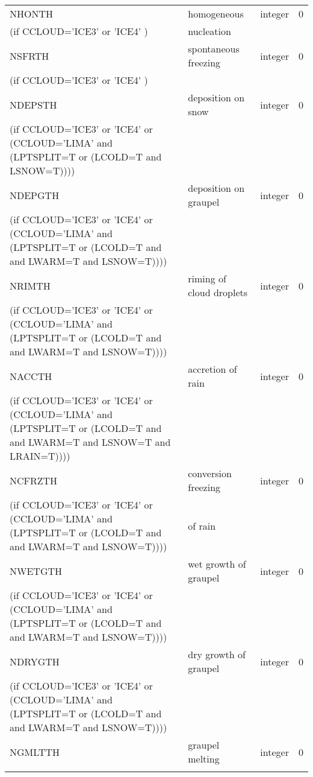 \begin{longtable} {|p{}|p{}|>{\centering}p{}|p{}<{\centering}|}
NHONTH   & homogeneous  & integer  &  0 \index{NHONTH!\innam{NAM\_BU\_RTH}}\\ \nopagebreak
(if CCLOUD='ICE3' or 'ICE4' ) & nucleation&   &  \\\hline
NSFRTH   & spontaneous freezing& integer  &  0 \index{NSFRTH!\innam{NAM\_BU\_RTH}}\\ \nopagebreak
(if CCLOUD='ICE3' or 'ICE4' ) & &   &  \\\hline
NDEPSTH  & deposition on snow  & integer  &  0 \index{NDEPSTH!\innam{NAM\_BU\_RTH}}\\ \nopagebreak
(if CCLOUD='ICE3' or 'ICE4' or (CCLOUD='LIMA' and (LPTSPLIT=T or (LCOLD=T and LSNOW=T)))) & &   &  \\\hline
NDEPGTH  & deposition on graupel & integer  &  0 \index{NDEPGTH!\innam{NAM\_BU\_RTH}}\\ \nopagebreak
(if CCLOUD='ICE3' or 'ICE4' or (CCLOUD='LIMA' and (LPTSPLIT=T or (LCOLD=T and and LWARM=T and LSNOW=T)))) & &   &  \\\hline
NRIMTH   & riming of cloud droplets & integer  &  0 \index{NRIMTH!\innam{NAM\_BU\_RTH}}\\ \nopagebreak
(if CCLOUD='ICE3' or 'ICE4' or (CCLOUD='LIMA' and (LPTSPLIT=T or (LCOLD=T and and LWARM=T and LSNOW=T)))) & &   &  \\\hline
NACCTH   & accretion of rain   & integer  &  0 \index{NACCTH!\innam{NAM\_BU\_RTH}}\\ \nopagebreak
(if CCLOUD='ICE3' or 'ICE4' or (CCLOUD='LIMA' and (LPTSPLIT=T or (LCOLD=T and and LWARM=T and LSNOW=T and LRAIN=T)))) & &   &  \\\hline
NCFRZTH  & conversion freezing & integer  &  0 \index{NCFRZTH!\innam{NAM\_BU\_RTH}}\\ \nopagebreak
(if CCLOUD='ICE3' or 'ICE4' or (CCLOUD='LIMA' and (LPTSPLIT=T or (LCOLD=T and and LWARM=T and LSNOW=T)))) & of rain &   &  \\\hline
NWETGTH  & wet growth of graupel& integer  &  0 \index{NWETGTH!\innam{NAM\_BU\_RTH}}\\ \nopagebreak
(if CCLOUD='ICE3' or 'ICE4' or (CCLOUD='LIMA' and (LPTSPLIT=T or (LCOLD=T and and LWARM=T and LSNOW=T)))) & &   &  \\\hline
NDRYGTH  & dry growth of graupel& integer  &  0 \index{NDRYGTH!\innam{NAM\_BU\_RTH}}\\ \nopagebreak
(if CCLOUD='ICE3' or 'ICE4' or (CCLOUD='LIMA' and (LPTSPLIT=T or (LCOLD=T and and LWARM=T and LSNOW=T)))) & &   &  \\\hline
NGMLTTH  & graupel melting      & integer  &  0 \index{NGMLTTH!\innam{NAM\_BU\_RTH}}\\ \nopagebreak

\end{longtable}
